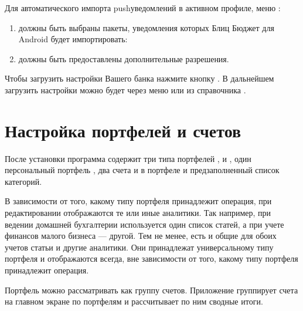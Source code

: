 \documentclass[a4paper,10pt,russian]{sphinxmanual}
\begin{document}
\sphinxAtStartPar
Для автоматического импорта push\sphinxhyphen{}уведомлений в активном профиле, меню :
\begin{enumerate}
%
\item {} 
\sphinxAtStartPar
должны быть выбраны пакеты, уведомления которых Блиц Бюджет для Android будет импортировать:

\item {} 
\sphinxAtStartPar
должны быть предоставлены дополнительные разрешения.

\end{enumerate}

\sphinxAtStartPar
Чтобы загрузить настройки Вашего банка нажмите кнопку . В дальнейшем загрузить
настройки можно будет через меню  или из справочника
.

\noindent{}

\noindent{}


\section{Настройка портфелей и счетов}
\label{\detokenize{getting-started:id4}}
\sphinxAtStartPar
После установки программа содержит три типа портфелей ,  и ,
один персональный портфель , два счета  и  в портфеле  и предзаполненный
список категорий.

\sphinxAtStartPar
В зависимости от того, какому типу портфеля принадлежит операция, при редактировании отображаются те или иные аналитики.  Так например,
при ведении домашней бухгалтерии используется один список статей, а при учете финансов малого бизнеса — другой.
Тем не менее, есть и общие для обоих учетов статьи и другие аналитики. Они принадлежат универсальному типу портфеля и
отображаются всегда, вне зависимости от того, какому типу портфеля принадлежит операция.

\sphinxAtStartPar
Портфель можно рассматривать как группу счетов. Приложение группирует счета на главном экране по портфелям и рассчитывает
по ним сводные итоги.
\end{document}

